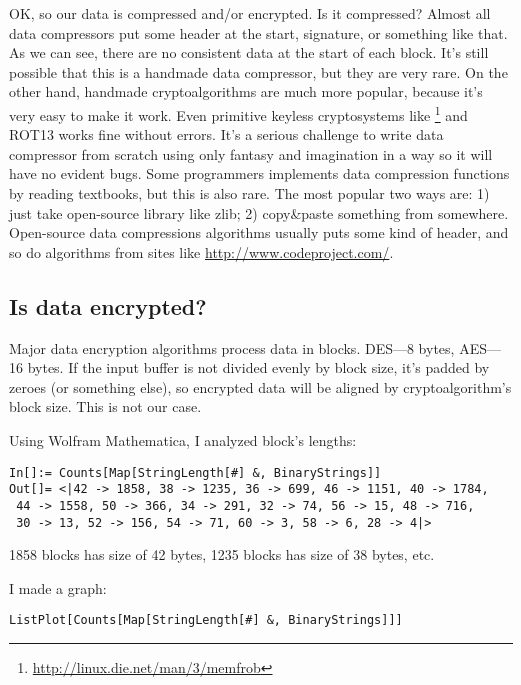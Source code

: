 OK, so our data is compressed and/or encrypted.
Is it compressed? Almost all data compressors put some header at the start, signature, or something like that.
As we can see, there are no consistent data at the start of each block.
It's still possible that this is a handmade data compressor, but they are very rare.
On the other hand, handmade cryptoalgorithms are much more popular, because it's very easy to make it work.
Even primitive keyless cryptosystems like \footnote{\url{http://linux.die.net/man/3/memfrob}}
and ROT13 works fine without errors.
It's a serious challenge to write data compressor from scratch using only fantasy and imagination in a way so it will have no evident bugs.
Some programmers implements data compression functions by reading textbooks, but this is also rare.
The most popular two ways are:
1) just take open-source library like zlib;
2) copy\&paste something from somewhere.
Open-source data compressions algorithms usually puts some kind of header, and so do
algorithms from sites like \url{http://www.codeproject.com/}.

\subsection{Is data encrypted?}

Major data encryption algorithms process data in blocks. DES---8 bytes, AES---16 bytes.
If the input buffer is not divided evenly by block size, it's padded by zeroes (or something else),
so encrypted data will be aligned by cryptoalgorithm's block size.
This is not our case.

Using Wolfram Mathematica, I analyzed block's lengths:

\begin{lstlisting}
In[]:= Counts[Map[StringLength[#] &, BinaryStrings]]
Out[]= <|42 -> 1858, 38 -> 1235, 36 -> 699, 46 -> 1151, 40 -> 1784,
 44 -> 1558, 50 -> 366, 34 -> 291, 32 -> 74, 56 -> 15, 48 -> 716,
 30 -> 13, 52 -> 156, 54 -> 71, 60 -> 3, 58 -> 6, 28 -> 4|>
\end{lstlisting}

1858 blocks has size of 42 bytes, 1235 blocks has size of 38 bytes, etc.

I made a graph:

\begin{lstlisting}
ListPlot[Counts[Map[StringLength[#] &, BinaryStrings]]]
\end{lstlisting}

\begin{figure}[H]
\centering
{}
\end{figure}

